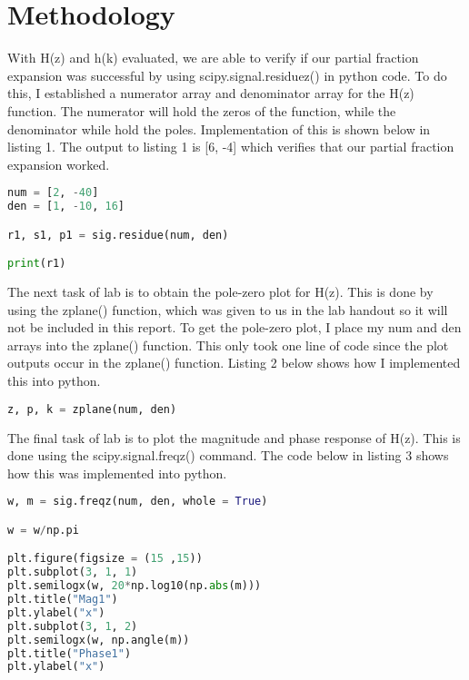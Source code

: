 \documentclass[12pt]{report}
\begin{document}
\section{Methodology}
\hspace{\parindent}With H(z) and h(k) evaluated, we are able to verify if our partial fraction expansion was successful by using scipy.signal.residuez() in python code. To do this, I established a numerator array and denominator array for the H(z) function. The numerator will hold the zeros of the function, while the denominator while hold the poles. Implementation of this is shown below in listing 1. The output to listing 1 is [6, -4] which verifies that our partial fraction expansion worked. \par
\begin{lstlisting}[language=Python, caption=Partial Fraction Expansion of H(z)]
num = [2, -40]
den = [1, -10, 16]

r1, s1, p1 = sig.residue(num, den)

print(r1)
\end{lstlisting}
\hspace{\parindent}The next task of lab is to obtain the pole-zero plot for H(z). This is done by using the zplane() function, which was given to us in the lab handout so it will not be included in this report. To get the pole-zero plot, I place my num and den arrays into the zplane() function. This only took one line of code since the plot outputs occur in the zplane() function. Listing 2 below shows how I implemented this into python.
\begin{lstlisting}[language=Python, caption=pole-zero plot for H(z) code]
z, p, k = zplane(num, den)
\end{lstlisting}
\hspace{\parindent}The final task of lab is to plot the magnitude and phase response of H(z). This is done using the scipy.signal.freqz() command. The code below in listing 3 shows how this was implemented into python. 
\begin{lstlisting}[language=Python, caption=Magnitude and Phase response code]
w, m = sig.freqz(num, den, whole = True)

w = w/np.pi

plt.figure(figsize = (15 ,15))
plt.subplot(3, 1, 1)
plt.semilogx(w, 20*np.log10(np.abs(m)))
plt.title("Mag1")
plt.ylabel("x")
plt.subplot(3, 1, 2)
plt.semilogx(w, np.angle(m))
plt.title("Phase1")
plt.ylabel("x")
\end{lstlisting}
\end{document}
